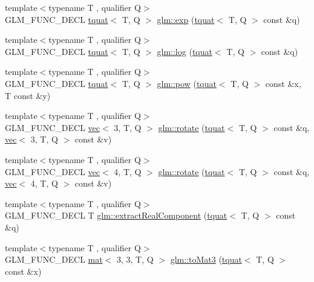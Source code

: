 \begin{DoxyCompactItemize}
{\footnotesize template$<$typename T , qualifier Q$>$ }\\G\+L\+M\+\_\+\+F\+U\+N\+C\+\_\+\+D\+E\+CL \hyperlink{structglm_1_1tquat}{tquat}$<$ T, Q $>$ \hyperlink{group__gtx__quaternion_ga72275e87ce62dc75a06d39a6c049835c}{glm\+::exp} (\hyperlink{structglm_1_1tquat}{tquat}$<$ T, Q $>$ const \&q)
\item 
{\footnotesize template$<$typename T , qualifier Q$>$ }\\G\+L\+M\+\_\+\+F\+U\+N\+C\+\_\+\+D\+E\+CL \hyperlink{structglm_1_1tquat}{tquat}$<$ T, Q $>$ \hyperlink{group__gtx__quaternion_gaad510f1a4ea26994b341c094ec4f4eed}{glm\+::log} (\hyperlink{structglm_1_1tquat}{tquat}$<$ T, Q $>$ const \&q)
\item 
{\footnotesize template$<$typename T , qualifier Q$>$ }\\G\+L\+M\+\_\+\+F\+U\+N\+C\+\_\+\+D\+E\+CL \hyperlink{structglm_1_1tquat}{tquat}$<$ T, Q $>$ \hyperlink{group__gtx__quaternion_gad382fc37392d537aecf2245a4597d8a3}{glm\+::pow} (\hyperlink{structglm_1_1tquat}{tquat}$<$ T, Q $>$ const \&x, T const \&y)
\item 
{\footnotesize template$<$typename T , qualifier Q$>$ }\\G\+L\+M\+\_\+\+F\+U\+N\+C\+\_\+\+D\+E\+CL \hyperlink{structglm_1_1vec}{vec}$<$ 3, T, Q $>$ \hyperlink{group__gtx__quaternion_ga49730f975e7f0ee3862a20b767aba583}{glm\+::rotate} (\hyperlink{structglm_1_1tquat}{tquat}$<$ T, Q $>$ const \&q, \hyperlink{structglm_1_1vec}{vec}$<$ 3, T, Q $>$ const \&v)
\item 
{\footnotesize template$<$typename T , qualifier Q$>$ }\\G\+L\+M\+\_\+\+F\+U\+N\+C\+\_\+\+D\+E\+CL \hyperlink{structglm_1_1vec}{vec}$<$ 4, T, Q $>$ \hyperlink{group__gtx__quaternion_ga97a5f8af1d63056b85a53ac28042fe77}{glm\+::rotate} (\hyperlink{structglm_1_1tquat}{tquat}$<$ T, Q $>$ const \&q, \hyperlink{structglm_1_1vec}{vec}$<$ 4, T, Q $>$ const \&v)
\item 
{\footnotesize template$<$typename T , qualifier Q$>$ }\\G\+L\+M\+\_\+\+F\+U\+N\+C\+\_\+\+D\+E\+CL T \hyperlink{group__gtx__quaternion_ga312385d0a8caa24c1daaa1d00ce4c2d3}{glm\+::extract\+Real\+Component} (\hyperlink{structglm_1_1tquat}{tquat}$<$ T, Q $>$ const \&q)
\item 
{\footnotesize template$<$typename T , qualifier Q$>$ }\\G\+L\+M\+\_\+\+F\+U\+N\+C\+\_\+\+D\+E\+CL \hyperlink{structglm_1_1mat}{mat}$<$ 3, 3, T, Q $>$ \hyperlink{group__gtx__quaternion_ga433955cb703d982427fb53b540d02f3d}{glm\+::to\+Mat3} (\hyperlink{structglm_1_1tquat}{tquat}$<$ T, Q $>$ const \&x)

\end{DoxyCompactItemize}
